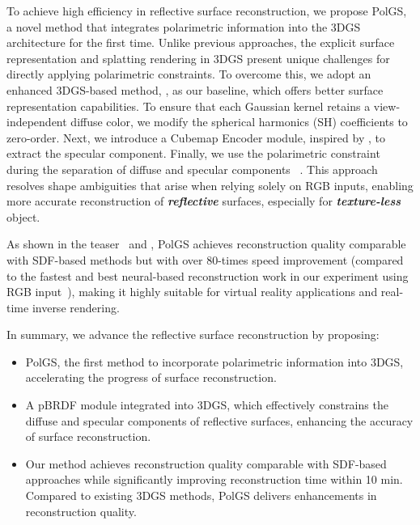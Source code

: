 To achieve high efficiency in reflective surface reconstruction, we propose PolGS, a novel method that integrates polarimetric information into the 3DGS architecture for the first time. Unlike previous approaches, the explicit surface representation and splatting  rendering in 3DGS present unique challenges for directly applying polarimetric constraints. To overcome this, we adopt an enhanced 3DGS-based method, \gs, as our baseline, which offers better surface representation capabilities. To ensure that each Gaussian kernel retains a view-independent diffuse color, we modify the spherical harmonics (SH) coefficients to zero-order. 
Next, we introduce a Cubemap Encoder module, inspired by \dr, to extract the specular component. 
Finally, we use the polarimetric constraint during the separation of diffuse and specular components ~\cite{baek2018simultaneous}. This approach resolves shape ambiguities that arise when relying solely on RGB inputs, enabling more accurate reconstruction of \textbf{\emph{reflective}} surfaces, especially for \textbf{\emph{texture-less}} object.


As shown in the teaser~ and , PolGS achieves reconstruction quality comparable with SDF-based methods but 
with over 80-times speed improvement (compared to the fastest and best neural-based reconstruction work in our experiment using RGB input~\cite{liu2023nero}),
 making it highly suitable for virtual reality applications and real-time inverse rendering.

In summary, we advance the reflective surface reconstruction by proposing:
\begin{itemize}
\item PolGS, the first method to incorporate polarimetric information into 3DGS, 
accelerating the progress of surface reconstruction.

\item A pBRDF module integrated into 3DGS, which effectively constrains the diffuse and specular components of reflective surfaces, 
enhancing the accuracy of surface reconstruction.

\item Our method achieves reconstruction quality comparable with SDF-based approaches while significantly 
improving reconstruction time within 10 min. Compared to existing 3DGS methods, PolGS delivers enhancements in 
reconstruction quality.
\end{itemize}